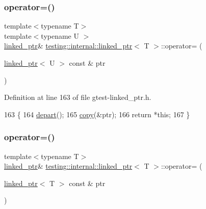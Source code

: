 \subsubsection{\texorpdfstring{operator=()}{operator=()}\hspace{0.1cm}{\footnotesize\ttfamily [1/2]}}
{\footnotesize\ttfamily template$<$typename T$>$ \\
template$<$typename U $>$ \\
\hyperlink{classtesting_1_1internal_1_1linked__ptr}{linked\+\_\+ptr}\& \hyperlink{classtesting_1_1internal_1_1linked__ptr}{testing\+::internal\+::linked\+\_\+ptr}$<$ T $>$\+::operator= (\begin{DoxyParamCaption}\item[{\hyperlink{classtesting_1_1internal_1_1linked__ptr}{linked\+\_\+ptr}$<$ U $>$ const \&}]{ptr }\end{DoxyParamCaption})\hspace{0.3cm}{\ttfamily [inline]}}



Definition at line 163 of file gtest-\/linked\+\_\+ptr.\+h.


\begin{DoxyCode}
163                                                                         \{
164     \hyperlink{classtesting_1_1internal_1_1linked__ptr_a0852ab20839140f29b2ad074339fccc7}{depart}();
165     \hyperlink{classtesting_1_1internal_1_1linked__ptr_aea2859970b65708fc4f7c8c4cbc7928a}{copy}(&ptr);
166     \textcolor{keywordflow}{return} *\textcolor{keyword}{this};
167   \}
\end{DoxyCode}
\mbox{\label{classtesting_1_1internal_1_1linked__ptr_a1f40b5e66e6cf7b661ea116c806f952e}} 
\subsubsection{\texorpdfstring{operator=()}{operator=()}\hspace{0.1cm}{\footnotesize\ttfamily [2/2]}}
{\footnotesize\ttfamily template$<$typename T$>$ \\
\hyperlink{classtesting_1_1internal_1_1linked__ptr}{linked\+\_\+ptr}\& \hyperlink{classtesting_1_1internal_1_1linked__ptr}{testing\+::internal\+::linked\+\_\+ptr}$<$ T $>$\+::operator= (\begin{DoxyParamCaption}\item[{\hyperlink{classtesting_1_1internal_1_1linked__ptr}{linked\+\_\+ptr}$<$ T $>$ const \&}]{ptr }\end{DoxyParamCaption})\hspace{0.3cm}{\ttfamily [inline]}}



